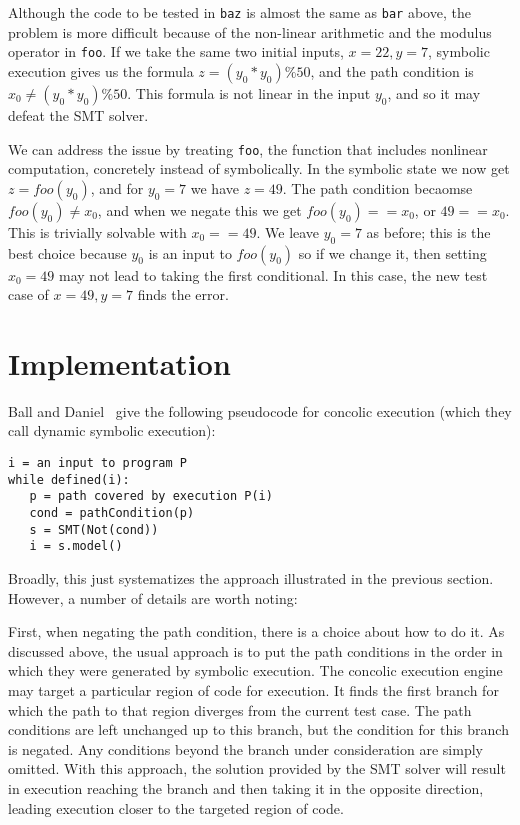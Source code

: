 \documentclass[11pt]{article}
\begin{document}
Although the code to be tested in \texttt{baz} is almost the same as \texttt{bar} above, the problem is more difficult because of the non-linear arithmetic and the modulus operator in \texttt{foo}.  If we take the same two initial inputs, $x=22, y=7$, symbolic execution gives us the formula $z=(y_0*y_0)\%50$, and the path condition is $x_0 \neq (y_0*y_0)\%50$.  This formula is not linear in the input $y_0$, and so it may defeat the SMT solver.

We can address the issue by treating \texttt{foo}, the function that includes nonlinear computation, concretely instead of symbolically.  In the symbolic state we now get $z=foo(y_0)$, and for $y_0=7$ we have $z=49$.  The path condition becaomse $foo(y_0) \neq x_0$, and when we negate this we get $foo(y_0)==x_0$, or $49==x_0$.  This is trivially solvable with $x_0==49$.  We leave $y_0=7$ as before; this is the best choice because $y_0$ is an input to $foo(y_0)$ so if we change it, then setting $x_0=49$ may not lead to taking the first conditional.  In this case, the new test case of $x=49, y=7$ finds the error.


\section{Implementation}

Ball and Daniel~\cite{Ball2015} give the following pseudocode for concolic execution (which they call dynamic symbolic execution):

\begin{lstlisting}
i = an input to program P
while defined(i):
   p = path covered by execution P(i)
   cond = pathCondition(p)
   s = SMT(Not(cond))
   i = s.model()
\end{lstlisting}

Broadly, this just systematizes the approach illustrated in the previous section.  However, a number of details are worth noting:

First, when negating the path condition, there is a choice about how to do it.  As discussed above, the usual approach is to put the path conditions in the order in which they were generated by symbolic execution.  The concolic execution engine may target a particular region of code for execution.  It finds the first branch for which the path to that region diverges from the current test case.  The path conditions are left unchanged up to this branch, but the condition for this branch is negated.  Any conditions beyond the branch under consideration are simply omitted.  With this approach, the solution provided by the SMT solver will result in execution reaching the branch and then taking it in the opposite direction, leading execution closer to the targeted region of code.
\end{document}
